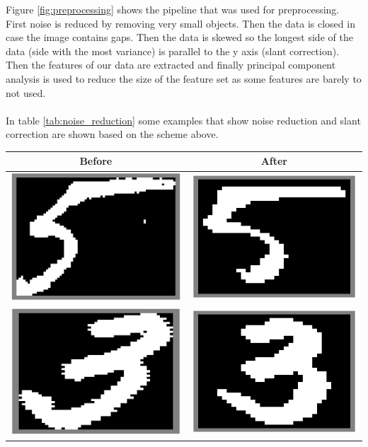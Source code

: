 \documentclass[%
        compressed,
        final,
        notitlepage,
        narroweqnarray,
        inline,
        twoside,
        ]{ieee}
\begin{document}
Figure \ref{fig:preprocessing} shows the pipeline that was used for preprocessing. First noise is reduced by removing very small objects. Then the data is closed in case the image contains gaps. Then the data is skewed so the longest side of the data (side with the most variance) is parallel to the y axis (slant correction). Then the features of our data are extracted and finally principal component analysis is used to reduce the size of the feature set as some features are barely to not used.\\\\
In table \ref{tab:noise_reduction} some examples that show noise reduction and slant correction
are shown based on the scheme above.
\begin{table}
    \begin{tabular}{|c|c|}
        \hline
        Before & After \\
        \hline
    \includegraphics[width=.4\columnwidth]{images/dirty5.png}
    &\includegraphics[width=.4\columnwidth]{images/clean5.png}\\
    \includegraphics[width=.4\columnwidth]{images/dirty3.png}
    &\includegraphics[width=.4\columnwidth]{images/clean3.png}\\

\end{tabular}
\end{table}
\end{document}

